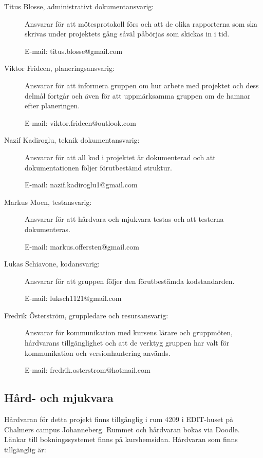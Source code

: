 \documentclass[a4paper]{article}
\begin{document}
\begin{description}
    \item[Titus Blosse, administrativt dokumentansvarig:] Ansvarar för att mötesprotokoll förs och att de olika rapporterna som ska skrivas under projektets gång såväl påbörjas som skickas in i tid.

    E-mail: titus.blosse@gmail.com

    \item[Viktor Frideen, planeringsansvarig:] Ansvarar för att informera gruppen om hur arbete med projektet och dess delmål fortgår och även för att uppmärksamma gruppen om de hamnar efter planeringen.

    E-mail: viktor.frideen@outlook.com

    \item[Nazif Kadiroglu, teknik dokumentansvarig:] Ansvarar för att all kod i projektet är dokumenterad och att dokumentationen följer förutbestämd struktur.

    E-mail: nazif.kadiroglu1@gmail.com

    \item[Markus Moen, testansvarig:] Ansvarar för att hårdvara och mjukvara testas och att testerna dokumenteras.

    E-mail: markus.offersten@gmail.com

    \item[Lukas Schiavone, kodansvarig:] Ansvarar för att gruppen följer den förutbestämda kodstandarden.

    E-mail: luksch1121@gmail.com

    \item[Fredrik Österström, gruppledare och resursansvarig:] Ansvarar för kommunikation med kursens lärare och gruppmöten, hårdvarans tillgänglighet och att de verktyg gruppen har valt för kommunikation och versionhantering används.

    E-mail: fredrik.osterstrom@hotmail.com
\end{description}

\subsection{Hård- och mjukvara}

Hårdvaran för detta projekt finns tillgänglig i rum 4209 i EDIT-huset på Chalmers campus Johanneberg. Rummet och hårdvaran bokas via Doodle. Länkar till bokningssystemet finns på kurshemsidan. Hårdvaran som finns tillgänglig är:
\end{document}
